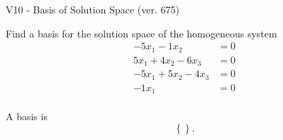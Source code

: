 \begin{exercise}
  \begin{exerciseTitle}V10 - Basis of Solution Space (ver. 675)\end{exerciseTitle}
  \begin{exerciseStatement}
    Find a basis for the solution space of the homogeneous system 
\begin{align*}
 -5 x_ 1 -1 x_ 2 &= 0  \\ 
  5 x_ 1 + 4 x_ 2 -6 x_ 3 &= 0  \\ 
  -5 x_ 1 + 5 x_ 2 -4 x_ 3 &= 0  \\ 
  -1 x_ 1 &= 0  \\ 
 \end{align*}


 
  \end{exerciseStatement}

  \begin{exerciseAnswer}
   A basis is   
\[\left\{\right\}.\]

  


  \end{exerciseAnswer}
\end{exercise}
